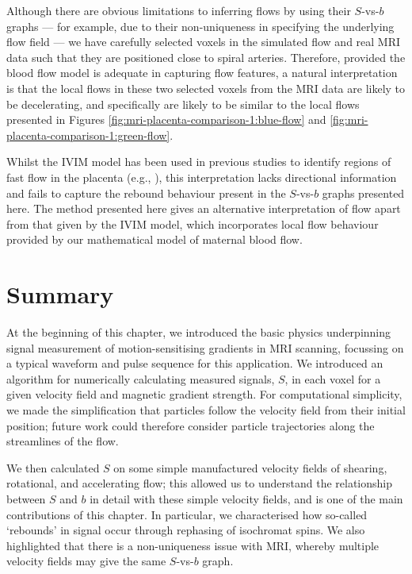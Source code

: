         Although there are obvious limitations to inferring flows by using their $S$-vs-$b$ graphs --- for example, due to their non-uniqueness in specifying the underlying flow field --- we have carefully selected voxels in the simulated flow and real MRI data such that they are positioned close to spiral arteries. Therefore, provided the blood flow model is adequate in capturing flow features, a natural interpretation is that the local flows in these two selected voxels from the MRI data are likely to be decelerating, and specifically are likely to be similar to the local flows presented in Figures \ref{fig:mri-placenta-comparison-1:blue-flow} and \ref{fig:mri-placenta-comparison-1:green-flow}. 
        
        Whilst the IVIM model has been used in previous studies to identify regions of fast flow in the placenta (e.g., \cite{dellschaftHaemodynamicsHumanPlacenta2020}), this interpretation lacks directional information and fails to capture the rebound behaviour present in the $S$-vs-$b$ graphs presented here. The method presented here gives an alternative interpretation of flow apart from that given by the IVIM model, which incorporates local flow behaviour provided by our mathematical model of maternal blood flow.

    \section{Summary} \label{sec:numerical-mri:summary}
        At the beginning of this chapter, we introduced the basic physics underpinning signal measurement of motion-sensitising gradients in MRI scanning, focussing on a typical waveform and pulse sequence for this application. We introduced an algorithm for numerically calculating measured signals, $S$, in each voxel for a given velocity field and magnetic gradient strength. For computational simplicity, we made the simplification that particles follow the velocity field from their initial position; future work could therefore consider particle trajectories along the streamlines of the flow.
        
        We then calculated $S$ on some simple manufactured velocity fields of shearing, rotational, and accelerating flow; this allowed us to understand the relationship between $S$ and $b$ in detail with these simple velocity fields, and is one of the main contributions of this chapter. In particular, we characterised how so-called `rebounds' in signal occur through rephasing of isochromat spins. We also highlighted that there is a non-uniqueness issue with MRI, whereby multiple velocity fields may give the same $S$-vs-$b$ graph.

